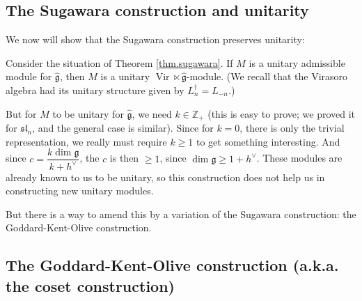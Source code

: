 \documentclass[etingof-lie.tex]{subfiles}
\begin{document}
\subsection{The Sugawara construction and unitarity}

We now will show that the Sugawara construction preserves unitarity:

\begin{proposition}
Consider the situation of Theorem \ref{thm.sugawara}. If $M$ is a unitary
admissible module for $\widehat{\mathfrak{g}}$, then $M$ is a unitary
$\operatorname*{Vir}\ltimes\widehat{\mathfrak{g}}$-module. (We recall that the
Virasoro algebra had its unitary structure given by $L_{n}^{\dag}=L_{-n}$.)
\end{proposition}

But for $M$ to be unitary for $\widehat{\mathfrak{g}}$, we need $k\in
\mathbb{Z}_{+}$ (this is easy to prove; we proved it for $\mathfrak{sl}_{n}$,
and the general case is similar). Since for $k=0$, there is only the trivial
representation, we really must require $k\geq1$ to get something interesting.
And since $c=\dfrac{k\dim\mathfrak{g}}{k+h^{\vee}}$, the $c$ is then $\geq1$,
since $\dim\mathfrak{g}\geq1+h^{\vee}$. These modules are already known to us
to be unitary, so this construction does not help us in constructing new
unitary modules.

But there is a way to amend this by a variation of the Sugawara construction:
the Goddard-Kent-Olive construction.

\subsection{The Goddard-Kent-Olive construction (a.k.a. the coset
construction)}
\end{document}
